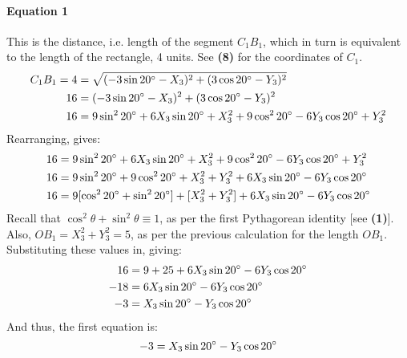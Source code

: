\documentclass{article}
\begin{document}
            \paragraph{Equation 1} This is the distance, i.e. length of the segment $C_1B_1$, which in turn is equivalent to the length of the rectangle, 4 units. See \textbf{(8)} for the coordinates of $C_1$.
            \begin{align*}
                C_1B_1 = 4 &= \sqrt{(-3\sin{20\degree} - X_3)^2 + (3\cos{20\degree} - Y_3)^2} \\
                16 &= (-3\sin{20\degree} - X_3)^2 + (3\cos{20\degree} - Y_3)^2 \\
                16 &= 9\sin^2{20\degree} + 6X_3\sin{20\degree} + X_3^2 + 9\cos^2{20\degree} - 6Y_3\cos{20\degree} + Y_3^2
            \end{align*}
            Rearranging, gives:
            \begin{align*}
                16 &= 9\sin^2{20\degree} + 6X_3\sin{20\degree} + X_3^2 + 9\cos^2{20\degree} - 6Y_3\cos{20\degree} + Y_3^2 \\
                16 &= 9\sin^2{20\degree} + 9\cos^2{20\degree} + X_3^2 + Y_3^2 + 6X_3\sin{20\degree} - 6Y_3\cos{20\degree} \\
                16 &= 9[\cos^2{20\degree} + \sin^2{20\degree}] + [X_3^2 + Y_3^2] + 6X_3\sin{20\degree} - 6Y_3\cos{20\degree}
            \end{align*}
            Recall that $\cos^2{\theta} + \sin^2{\theta} \equiv 1$, as per the first Pythagorean identity [see \textbf{(1)}]. Also, $OB_1 = X_3^2 + Y_3^2 = 5$, as per the previous calculation for the length $OB_1$. Substituting these values in, giving:
            \begin{align*}
                16 &= 9 + 25 + 6X_3\sin{20\degree} - 6Y_3\cos{20\degree} \\
                -18 &= 6X_3\sin{20\degree} - 6Y_3\cos{20\degree} \\
                -3 &= X_3\sin{20\degree} - Y_3\cos{20\degree}
            \end{align*}
            And thus, the first equation is:
            \begin{equation}
                -3 = X_3\sin{20\degree} - Y_3\cos{20\degree}
            \end{equation} \\\\
\end{document}

